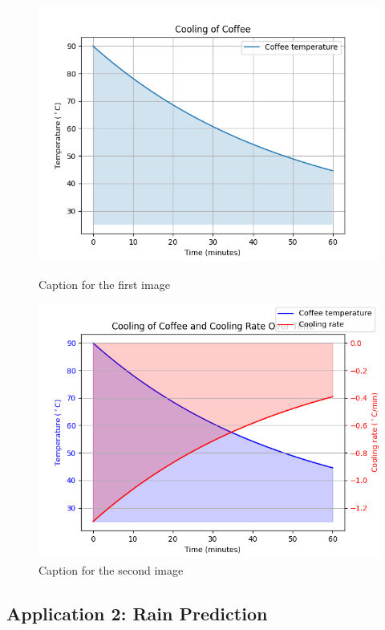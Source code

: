 \documentclass[12pt, a4paper]{article}
\begin{document}
\begin{figure}[h]
    \centering
    \begin{minipage}[b]{0.45\textwidth}
        \includegraphics[width=\textwidth]{./1.png}
        \caption{Caption for the first image}
        \label{fig:image1}
    \end{minipage}
    \hfill
    \begin{minipage}[b]{0.45\textwidth}
        \includegraphics[width=\textwidth]{./2.png}
        \caption{Caption for the second image}
        \label{fig:image2}
    \end{minipage}
\end{figure}

\subsection{Application 2: Rain Prediction}
\end{document}
